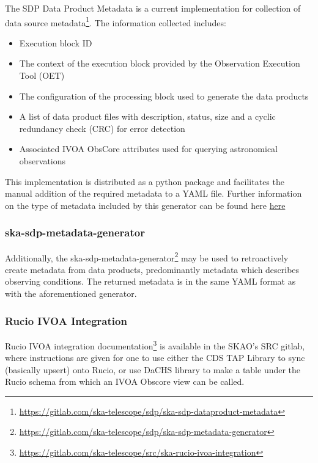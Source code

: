 The SDP Data Product Metadata is a current implementation for collection of data source metadata\footnote{\url{https://gitlab.com/ska-telescope/sdp/ska-sdp-dataproduct-metadata}}.
The information collected includes:

\begin{itemize}
    \item Execution block ID
    \item The context of the execution block provided by the Observation Execution Tool (OET)
    \item The configuration of the processing block used to generate the data products
    \item A list of data product files with description, status, size and a cyclic redundancy check (CRC) for error detection
    \item Associated IVOA ObsCore attributes used for querying astronomical observations
\end{itemize}

This implementation is distributed as a python package and facilitates the manual addition of the required metadata to a YAML file. 
Further information on the type of metadata included by this generator can be found here \href{https://confluence.skatelescope.org/pages/viewpage.action?spaceKey=SWSI&title=ADR-55+Definition+of+metadata+for+data+management+at+AA0.5}{here}

\subsubsection{ska-sdp-metadata-generator}

Additionally, the ska-sdp-metadata-generator\footnote{\url{https://gitlab.com/ska-telescope/sdp/ska-sdp-metadata-generator}} may be used to retroactively create metadata from data products, predominantly metadata which describes observing conditions.
The returned metadata is in the same YAML format as with the aforementioned generator. 

\subsubsection{Rucio IVOA Integration}

Rucio IVOA integration documentation\footnote{\url{https://gitlab.com/ska-telescope/src/ska-rucio-ivoa-integration}} 
is available in the SKAO's SRC gitlab, where instructions are given for one to use either the CDS TAP Library to sync (basically upsert) onto Rucio, or use DaCHS library to make a table under the Rucio schema from which an IVOA Obscore view can be called.
